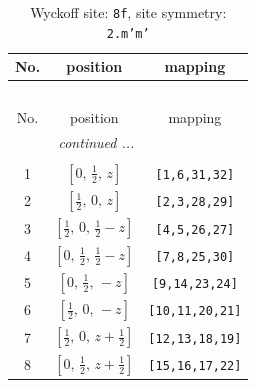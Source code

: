 \documentclass[fleqn,8pt]{jsarticle}
\begin{document}
\begin{longtable}{ccc}
\caption{Wyckoff site: {\tt 8f}, site symmetry: {\tt 2.m'm'}}
 \\
 \hline \hline
No. & position & mapping \\ \hline \endfirsthead

\multicolumn{2}{l}{\tablename\ \thetable{}} \\
 \hline \hline
No. & position & mapping \\ \hline \endhead

 \hline \hline
\multicolumn{2}{r}{\footnotesize\it continued ...} \\ \endfoot

 \hline \hline
\multicolumn{2}{r}{} \\ \endlastfoot

1 & $\left[ 0,\, \frac{1}{2},\, z \right]$ & {\tt [1,6,31,32]} \\ \hline
2 & $\left[ \frac{1}{2},\, 0,\, z \right]$ & {\tt [2,3,28,29]} \\ \hline
3 & $\left[ \frac{1}{2},\, 0,\, \frac{1}{2} - z \right]$ & {\tt [4,5,26,27]} \\ \hline
4 & $\left[ 0,\, \frac{1}{2},\, \frac{1}{2} - z \right]$ & {\tt [7,8,25,30]} \\ \hline
5 & $\left[ 0,\, \frac{1}{2},\, - z \right]$ & {\tt [9,14,23,24]} \\ \hline
6 & $\left[ \frac{1}{2},\, 0,\, - z \right]$ & {\tt [10,11,20,21]} \\ \hline
7 & $\left[ \frac{1}{2},\, 0,\, z + \frac{1}{2} \right]$ & {\tt [12,13,18,19]} \\ \hline
8 & $\left[ 0,\, \frac{1}{2},\, z + \frac{1}{2} \right]$ & {\tt [15,16,17,22]} \\
\end{longtable}
\renewcommand{\arraystretch}{1.2}
\end{document}
